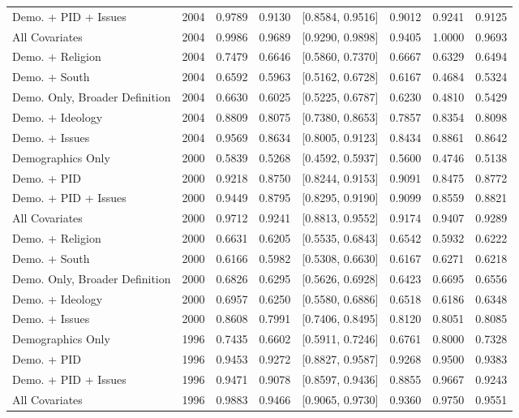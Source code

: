 \begin{longtable}{lrrrlrrr}
  Demo. + PID + Issues & 2004 & 0.9789 & 0.9130 & [0.8584, 0.9516] & 0.9012 & 0.9241 & 0.9125 \\ 
  All Covariates & 2004 & 0.9986 & 0.9689 & [0.9290, 0.9898] & 0.9405 & 1.0000 & 0.9693 \\ 
  Demo. + Religion & 2004 & 0.7479 & 0.6646 & [0.5860, 0.7370] & 0.6667 & 0.6329 & 0.6494 \\ 
  Demo. + South & 2004 & 0.6592 & 0.5963 & [0.5162, 0.6728] & 0.6167 & 0.4684 & 0.5324 \\ 
  Demo. Only, Broader Definition & 2004 & 0.6630 & 0.6025 & [0.5225, 0.6787] & 0.6230 & 0.4810 & 0.5429 \\ 
  Demo. + Ideology & 2004 & 0.8809 & 0.8075 & [0.7380, 0.8653] & 0.7857 & 0.8354 & 0.8098 \\ 
  Demo. + Issues & 2004 & 0.9569 & 0.8634 & [0.8005, 0.9123] & 0.8434 & 0.8861 & 0.8642 \\ 
  Demographics Only & 2000 & 0.5839 & 0.5268 & [0.4592, 0.5937] & 0.5600 & 0.4746 & 0.5138 \\ 
  Demo. + PID & 2000 & 0.9218 & 0.8750 & [0.8244, 0.9153] & 0.9091 & 0.8475 & 0.8772 \\ 
  Demo. + PID + Issues & 2000 & 0.9449 & 0.8795 & [0.8295, 0.9190] & 0.9099 & 0.8559 & 0.8821 \\ 
  All Covariates & 2000 & 0.9712 & 0.9241 & [0.8813, 0.9552] & 0.9174 & 0.9407 & 0.9289 \\ 
  Demo. + Religion & 2000 & 0.6631 & 0.6205 & [0.5535, 0.6843] & 0.6542 & 0.5932 & 0.6222 \\ 
  Demo. + South & 2000 & 0.6166 & 0.5982 & [0.5308, 0.6630] & 0.6167 & 0.6271 & 0.6218 \\ 
  Demo. Only, Broader Definition & 2000 & 0.6826 & 0.6295 & [0.5626, 0.6928] & 0.6423 & 0.6695 & 0.6556 \\ 
  Demo. + Ideology & 2000 & 0.6957 & 0.6250 & [0.5580, 0.6886] & 0.6518 & 0.6186 & 0.6348 \\ 
  Demo. + Issues & 2000 & 0.8608 & 0.7991 & [0.7406, 0.8495] & 0.8120 & 0.8051 & 0.8085 \\ 
  Demographics Only & 1996 & 0.7435 & 0.6602 & [0.5911, 0.7246] & 0.6761 & 0.8000 & 0.7328 \\ 
  Demo. + PID & 1996 & 0.9453 & 0.9272 & [0.8827, 0.9587] & 0.9268 & 0.9500 & 0.9383 \\ 
  Demo. + PID + Issues & 1996 & 0.9471 & 0.9078 & [0.8597, 0.9436] & 0.8855 & 0.9667 & 0.9243 \\ 
  All Covariates & 1996 & 0.9883 & 0.9466 & [0.9065, 0.9730] & 0.9360 & 0.9750 & 0.9551 \\ 

\end{longtable}
